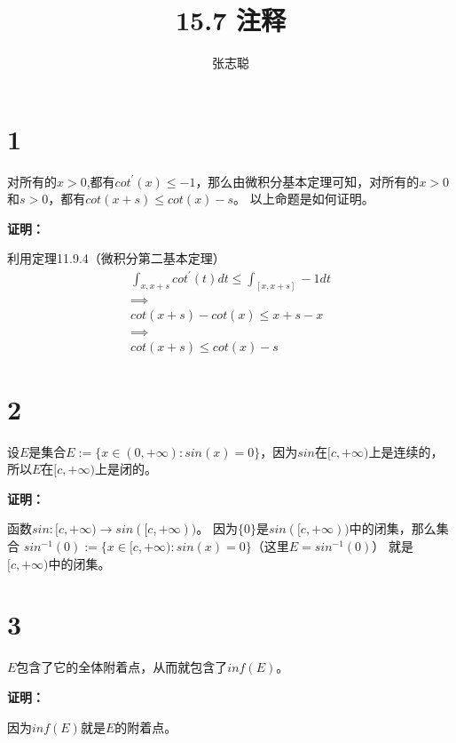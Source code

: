 \documentclass{article}
\begin{document}
\title{15.7 注释}
\author{张志聪}
\maketitle

\section*{1}

\begin{zremark}
  对所有的$x > 0$,都有$cot^\prime(x) \leq -1$，那么由微积分基本定理可知，对所有的$x > 0$和$s > 0$，都有$cot(x + s) \leq cot(x) - s$。
  以上命题是如何证明。
\end{zremark}
\textbf{证明：}

利用定理11.9.4（微积分第二基本定理）
\begin{align*}
  \int_{x, x+s} cot^\prime(t) dt \leq \int_{[x, x+s]} -1 dt \\
  \implies                                                  \\
  cot(x + s) - cot(x) \leq x + s - x                        \\
  \implies                                                  \\
  cot(x + s) \leq cot(x) - s
\end{align*}

\section*{2}

\begin{zremark}
  设$E$是集合$E := \{x \in (0, +\infty) : sin(x) = 0\}$，因为$sin$在$[c, +\infty)$上是连续的，
  所以$E$在$[c, +\infty)$上是闭的。
\end{zremark}
\textbf{证明：}

函数$sin : [c, +\infty) \to sin([c, +\infty))$。
因为$\{0\}$是$sin([c, +\infty))$中的闭集，那么集合
$sin^{-1}(0) := \{x \in [c, +\infty) : sin(x) = 0\}$（这里$E = sin^{-1}(0)$）
就是$[c, +\infty)$中的闭集。

\section*{3}

\begin{zremark}
  $E$包含了它的全体附着点，从而就包含了$inf(E)$。
\end{zremark}
\textbf{证明：}

因为$inf(E)$就是$E$的附着点。
\end{document}
